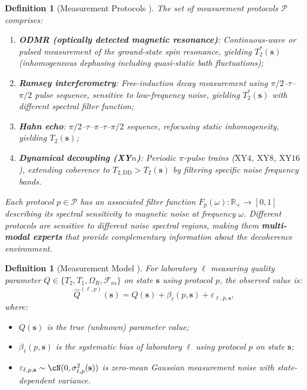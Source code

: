 \documentclass[11pt,a4paper]{article}
\newtheorem{definition}[theorem]{Definition}
\theoremstyle{definition}
\newcommand{\R}{\mathbb{R}}
\newcommand{\cP}{\mathcal{P}}
\newcommand{\Ttwo}{T_2}
\newcommand{\TtwoStar}{T_2^*}
\newcommand{\Tone}{T_1}
\newcommand{\RabiFreq}{\Omega_R}
\newcommand{\FidReadout}{\mathcal{F}_{\text{ro}}}
\begin{document}
\begin{definition}[Measurement Protocols ]
\label{def:protocols}
The set of measurement protocols $\cP$ comprises:
\begin{enumerate}[label=\textbf{P\arabic*:}, nosep]
    \item \textbf{ODMR (optically detected magnetic resonance)}:
    Continuous-wave or pulsed measurement of the ground-state spin resonance,
    yielding $\TtwoStar(\mathbf{s})$ (inhomogeneous dephasing including
    quasi-static bath fluctuations);
    \item \textbf{Ramsey interferometry}: Free-induction decay measurement
    using $\pi/2$--$\tau$--$\pi/2$ pulse sequence, sensitive to low-frequency
    noise, yielding $\TtwoStar(\mathbf{s})$ with different spectral filter
    function;
    \item \textbf{Hahn echo}: $\pi/2$--$\tau$--$\pi$--$\tau$--$\pi/2$ sequence,
    refocusing static inhomogeneity, yielding $\Ttwo(\mathbf{s})$;
    \item \textbf{Dynamical decoupling (XY$n$)}: Periodic $\pi$-pulse trains
    ($\text{XY}4$, $\text{XY}8$, $\text{XY}16$), extending coherence to
    $T_{2,\text{DD}} > \Ttwo(\mathbf{s})$ by filtering specific noise
    frequency bands.
\end{enumerate}
Each protocol $p \in \cP$ has an associated filter function
$F_p(\omega): \R_+ \to [0,1]$ describing its spectral sensitivity to
magnetic noise at frequency $\omega$. Different protocols are sensitive
to different noise spectral regions, making them \textbf{multi-modal experts}
that provide complementary information about the decoherence environment.
\end{definition}

\begin{definition}[Measurement Model ]
\label{def:measurement}
For laboratory $\ell$ measuring quality parameter $Q \in \{\Ttwo, \Tone, \RabiFreq, \FidReadout\}$
on state $\mathbf{s}$ using protocol $p$, the observed value is:
\begin{equation}
    \widehat{Q}^{(\ell, p)}(\mathbf{s}) = Q(\mathbf{s}) + \beta_\ell(p, \mathbf{s}) + \varepsilon_{\ell, p, \mathbf{s}},
    \label{eq:measurement_model}
\end{equation}
where:
\begin{itemize}[nosep]
    \item $Q(\mathbf{s})$ is the true (unknown) parameter value;
    \item $\beta_\ell(p, \mathbf{s})$ is the systematic bias of laboratory $\ell$
    using protocol $p$ on state $\mathbf{s}$;
    \item $\varepsilon_{\ell, p, \mathbf{s}} \sim \cN(0, \sigma_{\ell, p}^2(\mathbf{s}))$
    is zero-mean Gaussian measurement noise with state-dependent variance.
\end{itemize}
\end{definition}
\end{document}
